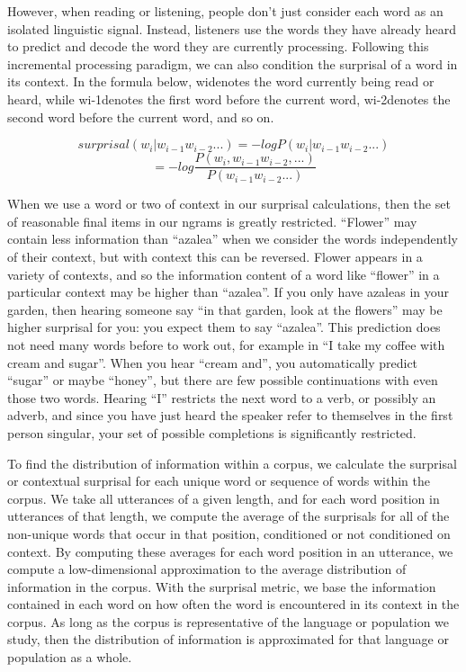 \documentclass[man,floatsintext]{apa6}
\begin{document}
However, when reading or listening, people don't just consider each word as an isolated linguistic signal. Instead, listeners use the words they have already heard to predict and decode the word they are currently processing. Following this incremental processing paradigm, we can also condition the surprisal of a word in its context. In the formula below, widenotes the word currently being read or heard, while wi-1denotes the first word before the current word, wi-2denotes the second word before the current word, and so on.

\[surprisal(w_i|w_{i-1}w_{i-2}...) = -log P(w_i|w_{i-1}w_{i-2}...)\]
\[= -log \frac{P(w_i,w_{i-1}w_{i-2},...)}{P(w_{i-1}w_{i-2}...)}\]

When we use a word or two of context in our surprisal calculations, then the set of reasonable final items in our ngrams is greatly restricted. \enquote{Flower} may contain less information than \enquote{azalea} when we consider the words independently of their context, but with context this can be reversed. Flower appears in a variety of contexts, and so the information content of a word like \enquote{flower} in a particular context may be higher than \enquote{azalea}. If you only have azaleas in your garden, then hearing someone say \enquote{in that garden, look at the flowers} may be higher surprisal for you: you expect them to say \enquote{azalea}. This prediction does not need many words before to work out, for example in \enquote{I take my coffee with cream and sugar}. When you hear \enquote{cream and}, you automatically predict \enquote{sugar} or maybe \enquote{honey}, but there are few possible continuations with even those two words. Hearing \enquote{I} restricts the next word to a verb, or possibly an adverb, and since you have just heard the speaker refer to themselves in the first person singular, your set of possible completions is significantly restricted.

To find the distribution of information within a corpus, we calculate the surprisal or contextual surprisal for each unique word or sequence of words within the corpus. We take all utterances of a given length, and for each word position in utterances of that length, we compute the average of the surprisals for all of the non-unique words that occur in that position, conditioned or not conditioned on context. By computing these averages for each word position in an utterance, we compute a low-dimensional approximation to the average distribution of information in the corpus. With the surprisal metric, we base the information contained in each word on how often the word is encountered in its context in the corpus. As long as the corpus is representative of the language or population we study, then the distribution of information is approximated for that language or population as a whole.
\end{document}

